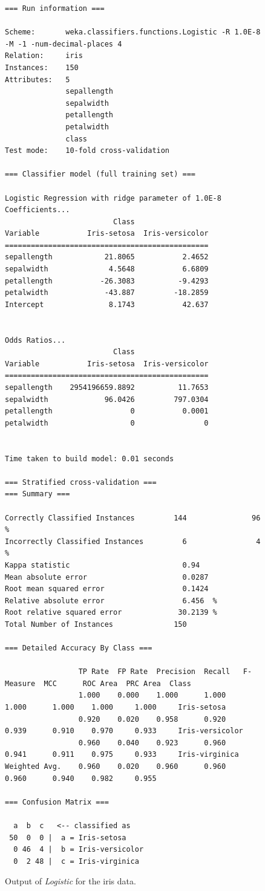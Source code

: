 \begin{figure}[!th]
\begin{mdframed}[innermargin=-1.0cm]
\begin{Verbatim}[fontsize=\tiny]
=== Run information ===

Scheme:       weka.classifiers.functions.Logistic -R 1.0E-8 -M -1 -num-decimal-places 4
Relation:     iris
Instances:    150
Attributes:   5
              sepallength
              sepalwidth
              petallength
              petalwidth
              class
Test mode:    10-fold cross-validation

=== Classifier model (full training set) ===

Logistic Regression with ridge parameter of 1.0E-8
Coefficients...
                         Class
Variable           Iris-setosa  Iris-versicolor
===============================================
sepallength            21.8065           2.4652
sepalwidth              4.5648           6.6809
petallength           -26.3083          -9.4293
petalwidth             -43.887         -18.2859
Intercept               8.1743           42.637


Odds Ratios...
                         Class
Variable           Iris-setosa  Iris-versicolor
===============================================
sepallength    2954196659.8892          11.7653
sepalwidth             96.0426         797.0304
petallength                  0           0.0001
petalwidth                   0                0


Time taken to build model: 0.01 seconds

=== Stratified cross-validation ===
=== Summary ===

Correctly Classified Instances         144               96      %
Incorrectly Classified Instances         6                4      %
Kappa statistic                          0.94  
Mean absolute error                      0.0287
Root mean squared error                  0.1424
Relative absolute error                  6.456  %
Root relative squared error             30.2139 %
Total Number of Instances              150     

=== Detailed Accuracy By Class ===

                 TP Rate  FP Rate  Precision  Recall   F-Measure  MCC      ROC Area  PRC Area  Class
                 1.000    0.000    1.000      1.000    1.000      1.000    1.000     1.000     Iris-setosa
                 0.920    0.020    0.958      0.920    0.939      0.910    0.970     0.933     Iris-versicolor
                 0.960    0.040    0.923      0.960    0.941      0.911    0.975     0.933     Iris-virginica
Weighted Avg.    0.960    0.020    0.960      0.960    0.960      0.940    0.982     0.955     

=== Confusion Matrix ===

  a  b  c   <-- classified as
 50  0  0 |  a = Iris-setosa
  0 46  4 |  b = Iris-versicolor
  0  2 48 |  c = Iris-virginica
\end{Verbatim}
\end{mdframed}
\caption{\label{fig:logistic_output}Output of \textit{Logistic} for the iris data.}
\end{figure}

